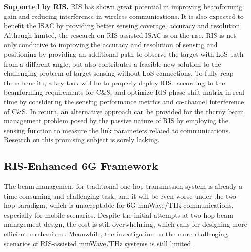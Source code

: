 \documentclass[journal,comsoc]{IEEEtran}
\begin{document}
{\bf{Supported by RIS.}} RIS has shown great potential in improving beamforming gain and reducing interference in wireless communications. It is also expected to benefit the ISAC by providing better sensing coverage, accuracy and resolution. Although limited, the research on RIS-assisted ISAC is on the rise. RIS is not only conducive to improving the accuracy and resolution of sensing and positioning by providing an additional path to observe the target with LoS path from a different angle, but also contributes a feasible new solution to the challenging problem of target sensing without LoS connections. To fully reap these benefits, a key task will be to properly deploy RISs according to the beamforming requirements for C\&S, and optimize RIS phase shift matrix in real time by considering the sensing performance metrics and co-channel interference of C\&S. In return, an alternative approach can be provided for the thorny beam management problem posed by the passive nature of RIS by employing the sensing function to measure the link parameters related to communications. Research on this promising subject is sorely lacking.





\subsection{RIS-Enhanced 6G Framework}
The beam management for traditional one-hop transmission system is already a time-consuming and challenging task, and it will be even worse under the two-hop paradigm, which is unacceptable for 6G mmWave/THz communications, especially for mobile scenarios. Despite the initial attempts at two-hop beam management design, the cost is still overwhelming, which calls for designing more efficient mechanisms. Meanwhile, the investigation on the more challenging scenarios of RIS-assisted mmWave/THz systems is still limited.
\end{document}
